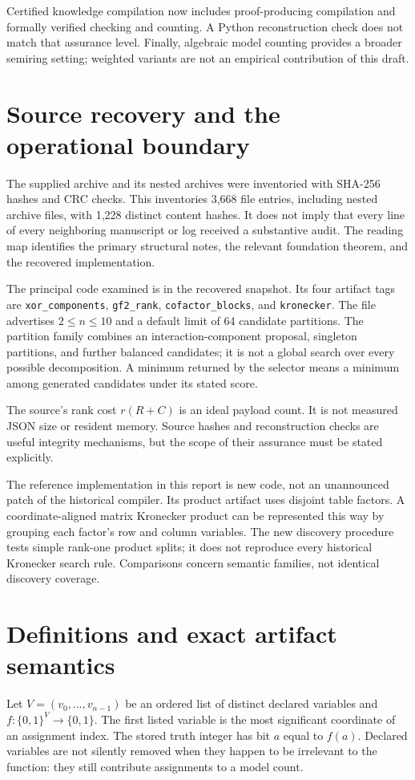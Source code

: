 \documentclass[11pt]{article}
\newcommand{\B}{\{0,1\}}
\theoremstyle{definition}\newtheorem{definition}[theorem]{Definition}
\theoremstyle{remark}\newtheorem{remark}[theorem]{Remark}
\begin{document}
Certified knowledge compilation now includes proof-producing compilation and formally verified checking and counting\cite{certified2025}. A Python reconstruction check does not match that assurance level. Finally, algebraic model counting provides a broader semiring setting\cite{kimmig2012}; weighted variants are not an empirical contribution of this draft.

\section{Source recovery and the operational boundary}
\label{sec:source}
The supplied archive and its nested archives were inventoried with SHA-256 hashes and CRC checks. This inventories 3,668 file entries, including nested archive files, with 1,228 distinct content hashes. It does not imply that every line of every neighboring manuscript or log received a substantive audit. The reading map identifies the primary structural notes, the relevant foundation theorem, and the recovered implementation.

The principal code examined is  in the recovered  snapshot. Its four artifact tags are \texttt{xor\_components}, \texttt{gf2\_rank}, \texttt{cofactor\_blocks}, and \texttt{kronecker}. The file advertises $2\le n\le10$ and a default limit of 64 candidate partitions. The partition family combines an interaction-component proposal, singleton partitions, and further balanced candidates; it is not a global search over every possible decomposition. A minimum returned by the selector means a minimum among generated candidates under its stated score.

The source's rank cost $r(R+C)$ is an ideal payload count. It is not measured JSON size or resident memory. Source hashes and reconstruction checks are useful integrity mechanisms, but the scope of their assurance must be stated explicitly.

The reference implementation in this report is new code, not an unannounced patch of the historical compiler. Its product artifact uses disjoint table factors. A coordinate-aligned matrix Kronecker product can be represented this way by grouping each factor's row and column variables. The new discovery procedure tests simple rank-one product splits; it does not reproduce every historical Kronecker search rule. Comparisons concern semantic families, not identical discovery coverage.

\section{Definitions and exact artifact semantics}
\label{sec:definitions}
Let $V=(v_0,\ldots,v_{n-1})$ be an ordered list of distinct declared variables and $f:\B^V\to\B$. The first listed variable is the most significant coordinate of an assignment index. The stored truth integer has bit $a$ equal to $f(a)$. Declared variables are not silently removed when they happen to be irrelevant to the function: they still contribute assignments to a model count.
\end{document}
